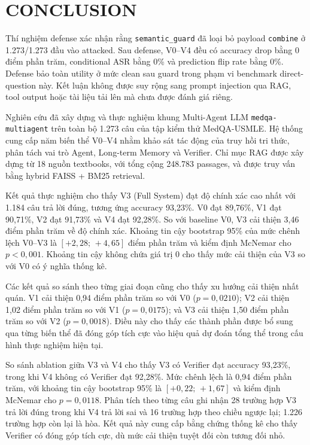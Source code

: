 \section{CONCLUSION}

Thí nghiệm defense xác nhận rằng \texttt{semantic\_guard} đã loại bỏ payload
\texttt{combine} ở 1.273/1.273 đầu vào attacked. Sau defense, V0--V4 đều có
accuracy drop bằng 0 điểm phần trăm, conditional ASR bằng 0\% và prediction
flip rate bằng 0\%. Defense bảo toàn utility ở mức clean sau guard trong phạm
vi benchmark direct-question này. Kết luận không được suy rộng sang prompt
injection qua RAG, tool output hoặc tài liệu tải lên mà chưa được đánh giá
riêng.

Nghiên cứu đã xây dựng và thực nghiệm khung Multi-Agent LLM
\texttt{medqa-multiagent} trên toàn bộ 1.273 câu của tập kiểm thử
MedQA-USMLE. Hệ thống cung cấp năm biến thể V0--V4 nhằm khảo sát tác
động của truy hồi tri thức, phân tách vai trò Agent, Long-term
Memory và Verifier. Chỉ mục RAG được xây dựng từ 18 nguồn textbooks,
với tổng cộng 248.783 passages, và được truy vấn bằng hybrid FAISS + BM25
retrieval.

Kết quả thực nghiệm cho thấy V3 (Full System) đạt độ chính xác cao
nhất với 1.184 câu trả lời đúng, tương ứng accuracy 93,23\%. V0 đạt
89,76\%, V1 đạt 90,71\%, V2 đạt 91,73\% và V4 đạt 92,28\%. So với
baseline V0, V3 cải thiện 3,46 điểm phần trăm về độ chính xác. Khoảng
tin cậy bootstrap 95\% của mức chênh lệch V0--V3 là
$[+2{,}28;\,+4{,}65]$ điểm phần trăm và kiểm định McNemar cho
$p<0{,}001$. Khoảng tin cậy không chứa giá trị 0 cho thấy mức cải
thiện của V3 so với V0 có ý nghĩa thống kê.

Các kết quả so sánh theo từng giai đoạn cũng cho thấy xu hướng cải
thiện nhất quán. V1 cải thiện 0,94 điểm phần trăm so với V0
($p=0{,}0210$); V2 cải thiện 1,02 điểm phần trăm so với V1
($p=0{,}0175$); và V3 cải thiện 1,50 điểm phần trăm so với V2
($p=0{,}0018$). Điều này cho thấy các thành phần được bổ sung qua
từng biến thể đã đóng góp tích cực vào hiệu quả dự đoán tổng thể
trong cấu hình thực nghiệm hiện tại.

So sánh ablation giữa V3 và V4 cho thấy V3 có Verifier đạt accuracy
93,23\%, trong khi V4 không có Verifier đạt 92,28\%. Mức chênh lệch
là 0,94 điểm phần trăm, với khoảng tin cậy bootstrap 95\% là
$[+0{,}22;\,+1{,}67]$ và kiểm định McNemar cho $p=0{,}0118$.
Phân tích theo từng câu ghi nhận 28 trường hợp V3 trả lời đúng trong
khi V4 trả lời sai và 16 trường hợp theo chiều ngược lại; 1.226
trường hợp còn lại là hòa. Kết quả này cung cấp bằng chứng thống kê
cho thấy Verifier có đóng góp tích cực, dù mức cải thiện tuyệt đối
còn tương đối nhỏ.

